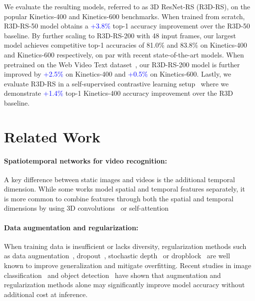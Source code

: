 \documentclass{article} \usepackage{iclr2021_conference,times}
\begin{document}
We evaluate the resulting models, referred to as 3D ResNet-RS (R3D-RS), on the popular Kinetics-400 and Kinetics-600 benchmarks. 
When trained from scratch, R3D-RS-50 model obtains a \textcolor{blue}{+3.8\%} top-1 accuracy improvement over the R3D-50 baseline. 
By further scaling to R3D-RS-200 with 48 input frames, our largest model achieves competitive top-1 accuracies of 81.0\% and 83.8\% on Kinetics-400 and Kinetics-600 respectively, on par with recent state-of-the-art models.
When pretrained on the Web Video Text dataset~\cite{stroud2020learning}, our R3D-RS-200 model is further improved by \textcolor{blue}{+2.5\%} on Kinetics-400 and \textcolor{blue}{+0.5\%} on Kinetics-600. 
Lastly, we evaluate R3D-RS in a self-supervised contrastive learning setup~\cite{qian2021spatiotemporal} where we demonstrate \textcolor{blue}{+1.4\%} top-1 Kinetics-400 accuracy improvement over the R3D baseline.

\section{Related Work}

\paragraph{Spatiotemporal networks for video recognition:}
A key difference between static images and videos is the additional temporal dimension. 
While some works model spatial and temporal features separately, it is more common to combine features through both the spatial and temporal dimensions by using 3D convolutions~\cite{taylor2010convolutional, tran2015learning, carreira2017quo} or self-attention~\cite{vaswani2017attention,Bello_2019_ICCV,ramachandran2019standalone,bello2021lambdanetworks,dosovitskiy2021image}

\paragraph{Data augmentation and regularization:}
When training data is insufficient or lacks diversity, regularization methods such as
data augmentation~\cite{Zhong2020RandomED, Devries2017ImprovedRO, Zhang2018mixupBE, Yun2019CutMixRS, Cubuk2019AutoAugmentLA, Cubuk2019RandAugmentPD}, 
dropout~\cite{dropout},
stochastic depth~\cite{stochasticdepth} or
dropblock~\cite{Ghiasi2018DropBlockAR}
are well known to improve generalization and mitigate overfitting.
Recent studies in image classification~\cite{bello2021revisiting} and object detection~\cite{Du2021SimpleTS} have shown that augmentation and regularization methods alone may significantly improve model accuracy without additional cost at inference.
\end{document}
